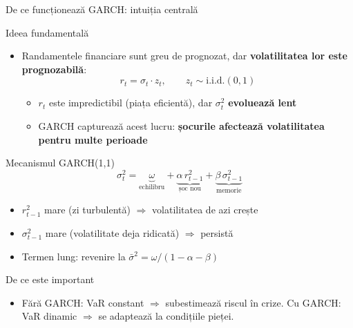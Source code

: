 \documentclass[9pt, aspectratio=169, t]{beamer}
\begin{document}
\begin{frame}{De ce funcționează GARCH: intuiția centrală}
    \small
        \vspace{-0.3cm}
        \begin{block}{Ideea fundamentală}
            \begin{itemize}
                \item Randamentele financiare sunt greu de prognozat, dar \textbf{volatilitatea lor este prognozabilă}:
            \vspace{-3mm}
            \[
                r_t = \sigma_t \cdot z_t, \qquad z_t \sim \text{i.i.d.}(0,1)
            \]
            \vspace{-2mm}
            \begin{itemize}
                \item $r_t$ este impredictibil (piața eficientă), dar $\sigma_t^2$ \textbf{evoluează lent}
                \item GARCH capturează acest lucru: \textbf{șocurile afectează volatilitatea pentru multe perioade}
            \end{itemize}
            \end{itemize}
        \end{block}
        \vspace{-2mm}
        \begin{exampleblock}{Mecanismul GARCH(1,1)}
            \vspace{-3mm}
            \[
                \sigma_t^2 = \underbrace{\omega}_{\text{echilibru}} + \underbrace{\alpha\, r_{t-1}^2}_{\text{șoc nou}} + \underbrace{\beta\, \sigma_{t-1}^2}_{\text{memorie}}
            \]
            \vspace{-2mm}
            \begin{itemize}\setlength{\itemsep}{-1pt}
                \item $r_{t-1}^2$ mare (zi turbulentă) $\Rightarrow$ volatilitatea de azi crește
                \item $\sigma_{t-1}^2$ mare (volatilitate deja ridicată) $\Rightarrow$ persistă
                \item Termen lung: revenire la $\bar{\sigma}^2 = \omega / (1 - \alpha - \beta)$
            \end{itemize}
        \end{exampleblock}
        \vspace{-2mm}
        \begin{alertblock}{De ce este important}
            \begin{itemize}
                \item Fără GARCH: VaR constant $\Rightarrow$ subestimează riscul în crize.
            Cu GARCH: VaR dinamic $\Rightarrow$ se adaptează la condițiile pieței.
            \end{itemize}
        \end{alertblock}
\end{frame}
\end{document}
